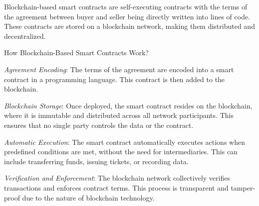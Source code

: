 \begin{multicols}{2}
Blockchain-based smart contracts are self-executing contracts with the
terms of the agreement between buyer and seller being directly written
into lines of code. These contracts are stored on a blockchain network,
making them distributed and decentralized.

How Blockchain-Based Smart Contracts Work?

\emph{Agreement Encoding}: The terms of the agreement are encoded into a
smart contract in a programming language. This contract is then added to
the blockchain.

\emph{Blockchain Storage}: Once deployed, the smart contract resides on
the blockchain, where it is immutable and distributed across all network
participants. This ensures that no single party controls the data or the
contract.

\emph{Automatic Execution}: The smart contract automatically executes
actions when predefined conditions are met, without the need for
intermediaries. This can include transferring funds, issuing tickets, or
recording data.

\emph{Verification and Enforcement}: The blockchain network collectively
verifies transactions and enforces contract terms. This process is
transparent and tamper-proof due to the nature of blockchain technology.
\end{multicols}


